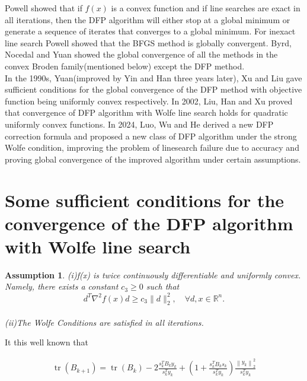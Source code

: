 \documentclass[12pt,a4paper,draft]{article}  %
\newcounter{cite}
\newtheorem{assumption}{Assumption}[section]
\theoremstyle{definition}
\numberwithin{equation}{section}
\begin{document}
Powell\cite{Po1} showed that if $f(x)$ is a convex function and if line searches are exact in all iterations, then the DFP algorithm will either stop at a global minimum or generate a sequence of iterates that converges to a global minimum. 
For inexact line search Powell\cite{Po2} showed that the BFGS method is globally convergent. 
Byrd, Nocedal and Yuan\cite{BNY} showed the global convergence of all the methods in the convex Broden family(mentioned below) except the DFP method.\\ 
In the 1990s, Yuan\cite{Yuan}(improved by Yin and Han\cite{YH} three years later), Xu and Liu\cite{XL} gave sufficient conditions for the global convergence of the DFP method with objective function being uniformly convex respectively.
In 2002, Liu, Han and Xu\cite{LHX} proved that convergence of DFP algorithm with Wolfe line search holds for quadratic uniformly convex functions.
In 2024, Luo, Wu and He\cite{LWH} derived a new DFP correction formula and proposed a new class of DFP algorithm under the strong Wolfe condition, improving the problem of linesearch failure due to accuracy and proving global convergence of the improved algorithm under certain assumptions.



\section{Some sufficient conditions for the convergence of the DFP algorithm with Wolfe line search}

\begin{assumption}

    (i)f(x) is twice continuously differentiable and uniformly convex. Namely, there exists a constant $c_{3} \geq 0$ such that
    \begin{equation*}
        d^{T} \nabla^{2} f(x) d \geqslant c_{3}\|d\|_{2}^{2}, \quad \forall d, x \in \mathbb{R}^{n} . \tag{1.23}
    \end{equation*}\\
    (ii)The Wolfe Conditions are satisfied in all iterations.
\end{assumption}

It this well known that

\begin{gather*}
    \operatorname{tr}\left(B_{k+1}\right)=\operatorname{tr}\left(B_{k}\right)-2 \frac{s_{k}^{T} B_{k} y_{k}}{s_{k}^{T} y_{k}}+\left(1+\frac{s_{k}^{T} B_{k} s_{k}}{s_{k}^{T} y_{k}}\right) \frac{\left\|y_{k}\right\|_{2}^{2}}{s_{k}^{T} y_{k}}  \tag{1.20}\\
\end{gather*}
\end{document}
